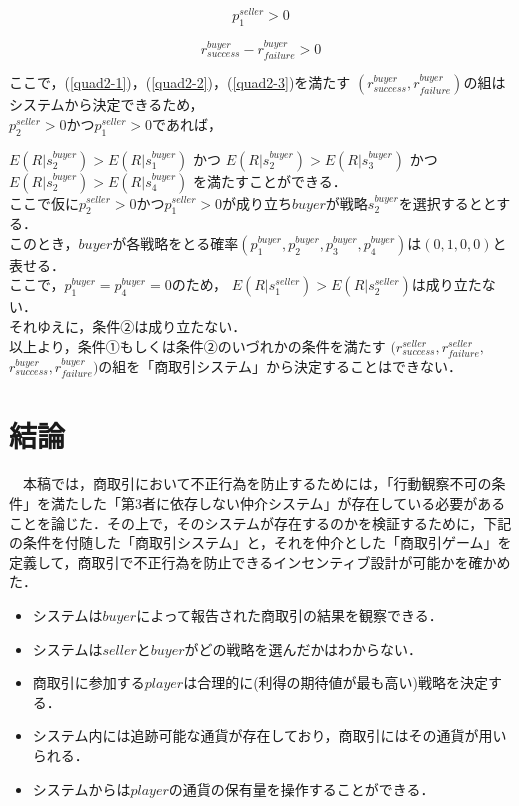 \documentclass[twocolumn, a4j]{article}
\begin{document}
\begin{equation}
  p^{seller}_1 > 0
\end{equation}

\begin{equation}
  \label{quad2-3}
  r^{buyer}_{success} - r^{buyer}_{failure} > 0
\end{equation}

ここで，(\ref{quad2-1})，(\ref{quad2-2})，(\ref{quad2-3})を満たす
$ (r^{buyer}_{success}, r^{buyer}_{failure})$の組はシステムから決定できるため，\\

$p^{seller}_2>0$かつ$p^{seller}_1>0$であれば，

$E(R|s^{buyer}_2)>E(R|s^{buyer}_1)$
かつ
$E(R|s^{buyer}_2) > E(R|s^{buyer}_3)$
かつ
$E(R|s^{buyer}_2) > E(R|s^{buyer}_4)$
を満たすことができる．\\

ここで仮に$p^{seller}_2>0$かつ$p^{seller}_1>0$が成り立ち$ buyer$が戦略$ s^{buyer}_2$を選択するととする．\\

このとき，$buyer$が各戦略をとる確率$(p^{buyer}_1, p^{buyer}_2, p^{buyer}_3, p^{buyer}_4)$は$ (0, 1, 0, 0)$と表せる．\\

ここで，$ p^{buyer}_1 = p^{buyer}_4 = 0$のため，
$E(R |s^{seller}_1) > E(R |s^{seller}_2)$は成り立たない．\\

それゆえに，条件②は成り立たない．\\

以上より，条件①もしくは条件②のいづれかの条件を満たす
$(r^{seller}_{success}, r^{seller}_{failure},$
$r^{buyer}_{success},r^{buyer}_{failure})$の組を「商取引システム」から決定することはできない．\\

\twocolumn
\section{結論}
  　本稿では，商取引において不正行為を防止するためには，「行動観察不可の条件」を満たした「第3者に依存しない仲介システム」が存在している必要があることを論じた．その上で，そのシステムが存在するのかを検証するために，下記の条件を付随した「商取引システム」と，それを仲介とした「商取引ゲーム」を定義して，商取引で不正行為を防止できるインセンティブ設計が可能かを確かめた．

  \begin{itemize}
    \item システムは$buyer$によって報告された商取引の結果を観察できる．
    \item システムは$seller$と$buyer$がどの戦略を選んだかはわからない．
    \item 商取引に参加する$player$は合理的に(利得の期待値が最も高い)戦略を決定する．
    \item システム内には追跡可能な通貨が存在しており，商取引にはその通貨が用いられる．
    \item システムからは$player$の通貨の保有量を操作することができる．
  \end{itemize}
\end{document}
